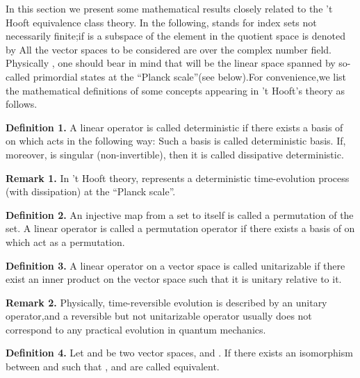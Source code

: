 \documentclass[a4paper,12pt]{article}
\begin{document}
In this section we present some mathematical results closely related to the
't Hooft equivalence class theory. In the following, \coordHE{} stands for index
sets not necessarily finite;if \coordHE{} is a subspace of \coordHE{}the element
\coordHE{} in the quotient space \coordHE{} is denoted by \coordHE{} All the
vector spaces to be considered are over the complex number field. Physically
, one should bear in mind that \coordHE{} will be the linear space spanned by
so-called primordial states at the ``Planck scale''(see below).For
convenience,we list the mathematical definitions of some concepts appearing
in 't Hooft's theory as follows.

\textbf{Definition 1.} A linear operator \coordHE{} is called
deterministic if there exists a basis \coordHE{} of \coordHE{} on which \coordHE{}
acts in the following way:\coordHE{} Such a basis is called \coordHE{}deterministic basis. If,
moreover, \myHighlight{$T$}\coordHE{} is singular (non-invertible), then it is called dissipative
deterministic.

\textbf{Remark 1.} In 't Hooft theory, \coordHE{} represents a deterministic
time-evolution process (with dissipation) at the ``Planck scale''.

\textbf{Definition 2.} An injective map from a set to itself is called a
permutation of the set. A linear operator \myHighlight{$T\in End(V)$}\coordHE{} is called a
permutation operator if there exists a basis of \myHighlight{$V$}\coordHE{} on which \coordHE{} act as a
permutation.

\textbf{Definition 3.} A linear operator on a vector space is called
unitarizable if there exist an inner product on the vector space such that
it is unitary relative to it.

\textbf{Remark 2.} Physically, time-reversible evolution is described by an
unitary operator,and a reversible but not unitarizable operator usually does
not correspond to any practical evolution in quantum mechanics.

\textbf{Definition 4.} Let \coordHE{} and \coordHE{} be two vector spaces, \coordHE{}
and \myHighlight{$S\in End(W)$}\coordHE{}. If there exists an isomorphism \myHighlight{$\varphi $}\coordHE{} between \myHighlight{$V$}\coordHE{} and
\myHighlight{$W$}\coordHE{} such that \myHighlight{$\varphi T=S\varphi $}\coordHE{}, \myHighlight{$T$}\coordHE{} and \myHighlight{$S$}\coordHE{} are called equivalent.
\end{document}
